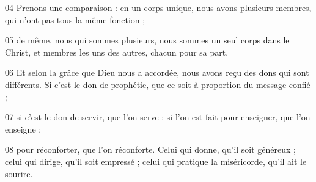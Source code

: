 
04 Prenons une comparaison : en un corps unique, nous avons plusieurs membres, qui n’ont pas tous la même fonction ;

05 de même, nous qui sommes plusieurs, nous sommes un seul corps dans le Christ, et membres les uns des autres, chacun pour sa part.

06 Et selon la grâce que Dieu nous a accordée, nous avons reçu des dons qui sont différents. Si c’est le don de prophétie, que ce soit à proportion du message confié ;

07 si c’est le don de servir, que l’on serve ; si l’on est fait pour enseigner, que l’on enseigne ;

08 pour réconforter, que l’on réconforte. Celui qui donne, qu’il soit généreux ; celui qui dirige, qu’il soit empressé ; celui qui pratique la miséricorde, qu’il ait le sourire.
